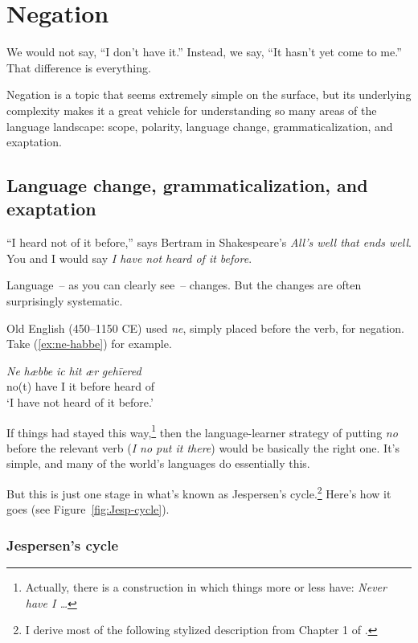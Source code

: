 \chapter{Negation}

\epigraph{We would not say, ``I don't have it.''
Instead, we say, ``It hasn't yet come to me.'' That difference
is everything.}{}

Negation is a topic that seems extremely simple on the surface, but its underlying complexity makes it a great vehicle for understanding so many areas of the language landscape: scope, polarity, language change, grammaticalization, and exaptation.

\section{Language change, grammaticalization, and exaptation}

``I heard not of it before,'' says Bertram in Shakespeare's \textit{All's well that ends well}. You and I would say \textit{I have not heard of it before}.

Language~-- as you can clearly see~-- changes. But the changes are often surprisingly systematic.

Old English (450--1150 CE) used \textit{ne}, simply placed before the verb, for negation. Take (\ref{ex:ne-habbe}) for example.

\ea \label{ex:ne-habbe}
    \gll \textit{Ne} \textit{hæbbe} \textit{ic} \textit{hit} \textit{ær} \textit{gehīered} \\ no(t) have I it before {heard of} \\
    \trans `I have not heard of it before.'
\z

If things had stayed this way,\footnote{Actually, there is a construction in which things more or less have: \textit{Never have I \dots}} then the language-learner strategy of putting \textit{no} before the relevant verb (\textit{I no put it there}) would be basically the right one. It's simple, and many of the world's languages do essentially this.

But this is just one stage in what's known as Jespersen's cycle.\footnote{I derive most of the following stylized description from Chapter 1 of \citet{Jespersen1917}.} Here's how it goes (see Figure~\ref{fig:Jesp-cycle}).

\subsection{Jespersen's cycle}

